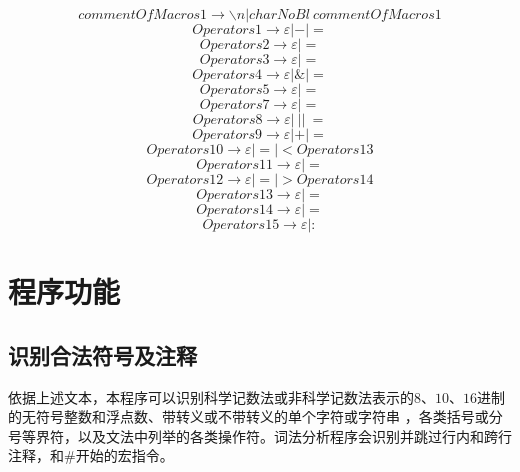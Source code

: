 \documentclass[UTF8]{ctexart}
\begin{document}
\begin{equation}
	commentOfMacros1 \rightarrow \backslash n | charNoBl \ commentOfMacros1
\end{equation}
\begin{equation}
	Operators1 \rightarrow \varepsilon | - | =
\end{equation}
\begin{equation}
	Operators2 \rightarrow \varepsilon | =
\end{equation}
\begin{equation}
	Operators3 \rightarrow \varepsilon | =
\end{equation}
\begin{equation}
	Operators4 \rightarrow \varepsilon | \& | =
\end{equation}
\begin{equation}
	Operators5 \rightarrow \varepsilon | =
\end{equation}
\begin{equation}
	Operators7 \rightarrow \varepsilon | =
\end{equation}
\begin{equation}
	Operators8 \rightarrow \varepsilon | \ | | \ =
\end{equation}
\begin{equation}
	Operators9 \rightarrow \varepsilon | + | =
\end{equation}
\begin{equation}
	Operators10 \rightarrow \varepsilon | = | < Operators13
\end{equation}
\begin{equation}
	Operators11 \rightarrow \varepsilon | =
\end{equation}
\begin{equation}
	Operators12 \rightarrow \varepsilon | = | > Operators14
\end{equation}
\begin{equation}
	Operators13 \rightarrow \varepsilon | =
\end{equation}
\begin{equation}
	Operators14 \rightarrow \varepsilon | =
\end{equation}
\begin{equation}
	Operators15 \rightarrow \varepsilon | \colon
\end{equation}
\section{程序功能}
\subsection{识别合法符号及注释}
依据上述文本，本程序可以识别科学记数法或非科学记数法表示的$8$、$10$、$16$进制的无符号整数和浮点数、带转义或不带转义的单个字符或字符串
，各类括号或分号等界符，以及文法中列举的各类操作符。词法分析程序会识别并跳过行内和跨行注释，和$\#$开始的宏指令。
\end{document}
